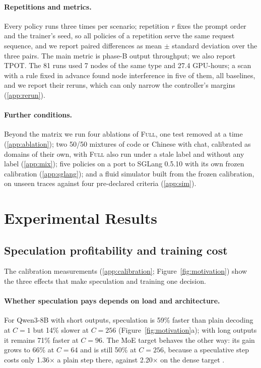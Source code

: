 \documentclass{article}
\newcommand{\pol}[1]{\textsc{#1}}
\begin{document}
\paragraph{Repetitions and metrics.} Every policy runs three times per scenario; repetition $r$ fixes the prompt order and the trainer's seed, so all policies of a repetition serve the same request sequence, and we report paired differences as mean $\pm$ standard deviation over the three pairs. The main metric is phase-B output throughput; we also report TPOT. The 81 runs used 7 nodes of the same type and 27.4 GPU-hours; a scan with a rule fixed in advance found node interference in five of them, all baselines, and we report their reruns, which can only narrow the controller's margins (\cref{app:rerun}).

\paragraph{Further conditions.} Beyond the matrix we run four ablations of \pol{Full}, one test removed at a time (\cref{app:ablation}); two 50/50 mixtures of code or Chinese with chat, calibrated as domains of their own, with \pol{Full} also run under a stale label and without any label (\cref{app:mix}); five policies on a port to SGLang 0.5.10 with its own frozen calibration (\cref{app:sglang}); and a fluid simulator built from the frozen calibration, on unseen traces against four pre-declared criteria (\cref{app:sim}).

\section{Experimental Results}\label{sec:evaluation}

\subsection{Speculation profitability and training cost}\label{sec:measure}

The calibration measurements (\cref{app:calibration}; Figure~\ref{fig:motivation}) show the three effects that make speculation and training one decision.

\paragraph{Whether speculation pays depends on load and architecture.} For Qwen3-8B with short outputs, speculation is 59\% faster than plain decoding at $C{=}1$ but 14\% slower at $C{=}256$ (Figure~\ref{fig:motivation}a); with long outputs it remains 71\% faster at $C{=}96$. The MoE target behaves the other way: its gain grows to 66\% at $C{=}64$ and is still 50\% at $C{=}256$, because a speculative step costs only 1.36$\times$ a plain step there, against 2.20$\times$ on the dense target \citep{huang2025moesd}.
\end{document}

